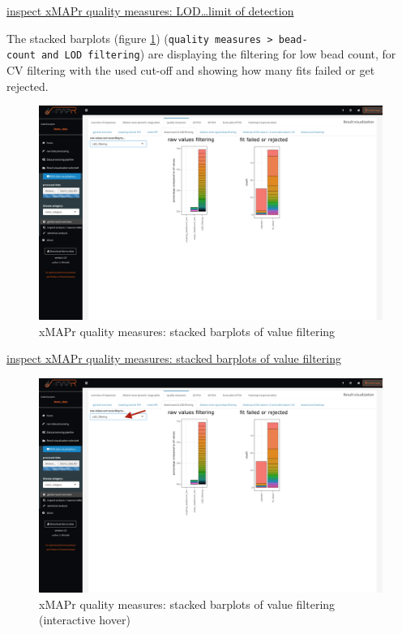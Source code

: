 \documentclass[
]{book}
\begin{document}
\href{figures/quality_measures__LOD.png}{inspect xMAPr quality measures: LOD\ldots limit of detection}

The stacked barplots (figure \ref{fig:BarplotsValueFiltering}) (\texttt{quality\ measures\ \textgreater{}\ bead-count\ and\ LOD\ filtering}) are displaying the filtering for low bead count, for CV filtering with the used cut-off and showing how many fits failed or get rejected.

\begin{figure}
\includegraphics[width=50.47in]{figures/quality_measures__value_filtering} \caption{xMAPr quality measures: stacked barplots of value filtering}\label{fig:BarplotsValueFiltering}
\end{figure}

\href{figures/quality_measures__value_filtering.png}{inspect xMAPr quality measures: stacked barplots of value filtering}

\begin{figure}
\includegraphics[width=50.47in]{figures/quality_measures__value_filtering1} \caption{xMAPr quality measures: stacked barplots of value filtering (interactive hover)}\label{fig:BarplotsValueFiltering1}
\end{figure}
\end{document}
